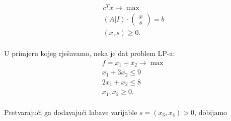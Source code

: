 \documentclass[a4paper, utf8, 11pt, colorlinks]{article}
\begin{document}
\begin{align}
    & c^T x \rightarrow \max \\
    & (A | I) \cdot \left (\begin{array}{c}
         x  \\
         s 
    \end{array} \right ) =  b \\
    & (x, s) \geq 0. \\
\end{align} 

U primjeru kojeg rješavamo, neka je dat problem LP-a:
\begin{align*}
    &f= x_1 + x_2 \rightarrow \max \nonumber \\
    & x_1 + 3 x_2 \leq 9 \nonumber \\
    & 2x_1 + x_2 \leq 8  \nonumber \\
    & x_1, x_2 \geq 0. \nonumber \\
\end{align*}
 
 Pretvarajući ga dodavajući labave varijable $s = (x_3, x_4)>0$, dobijamo 
\end{document}
